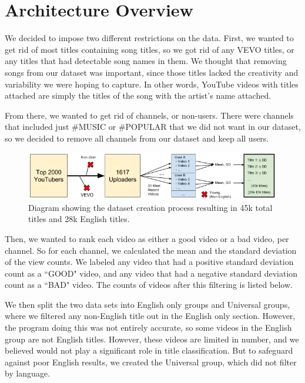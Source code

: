 \documentclass[a4paper,12pt]{article}
\begin{document}
\section{Architecture Overview}

We decided to impose two different restrictions on the data. First, we wanted to get rid of most titles containing song titles, so we got rid of any VEVO titles, or any titles that had detectable song names in them. We thought that removing songs from our dataset was important, since those titles lacked the creativity and variability we were hoping to capture. In other words, YouTube videos with titles attached are simply the titles of the song with the artist's name attached. 

From there, we wanted to get rid of channels, or non-users. There were channels that included just \#MUSIC or \#POPULAR that we did not want in our dataset, so we decided to remove all channels from our dataset and keep all users. 


\begin{figure}[h]
    \centering
    \includegraphics[width=.99\textwidth]{dataset}
    \caption{Diagram showing the dataset creation process resulting in 45k total titles and 28k English titles.}
    \label{fig:dataset}
\end{figure}

Then, we wanted to rank each video as either a good video or a bad video, per channel. So for each channel, we calculated the mean and the standard deviation of the view counts. We labeled any video that had a positive standard deviation count as a ``GOOD" video, and any video that had a negative standard deviation count as a ``BAD" video. The counts of videos after this filtering is listed below. 

We then split the two data sets into English only groups and Universal groups, where we filtered any non-English title out in the English only section. However, the program doing this was not entirely accurate, so some videos in the English group are not English titles. However, these videos are limited in number, and we believed would not play a significant role in title classification. But to safeguard against poor English results, we created the Universal group, which did not filter by language. 
\end{document}
